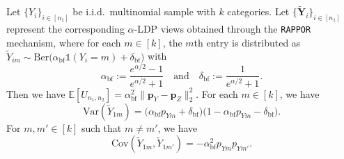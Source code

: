 \documentclass[twoside,11pt]{article}
\newcommand{\rvTwo}{Y}
\newcommand{\rvThree}{Z}
\newcommand{\vectorize}[1]{\mathbf{#1}}
\newcommand{\rvY}{Y}
\newcommand{\rVecY}{\vectorize{\rvY}}
\newcommand{\mE}{\mathbb{E}} %
\newcommand{\sampleIndexOne}{i}
\newcommand{\alphabetSize}{k} %
\newcommand{\vectorIndex}{m}
\newcommand{\sampleSize}{n}
\newcommand{\probVecElement}[2]{p_{{#1}{#2}}}
\newcommand{\probVec}{\mathbf{p}} %
\newcommand{\privacyParameter}{\alpha} %
\newcommand{\privacyParameterrappor}{\privacyParameter_{\mathrm{bf}}}
\newcommand{\smallNumber}{\delta}
\newcommand{\smallNumberrappor}{\smallNumber_{\mathrm{bf}}}
\begin{document}
\begin{appendix}
	\begin{lemma}
		\label{lemma:rappor_var}
		Let $\{\rvTwo_\sampleIndexOne\}_{\sampleIndexOne \in [\sampleSize_1]}$  be i.i.d.~multinomial sample with $\alphabetSize$ categories. Let $\{\tilde{\rVecY}_i\}_{i \in [n_1]}$ represent the corresponding $\privacyParameter$-LDP views obtained through the \textnormal{\texttt{RAPPOR}} mechanism, where for each $m \in [k]$, the $m$th entry is distributed as 
		$
		\tilde{\rvTwo}_{\sampleIndexOne \vectorIndex}
		\sim
		\mathrm{Ber}
		\bigl(
		\privacyParameterrappor \mathds{1}
		(
		\rvTwo_{\sampleIndexOne} = \vectorIndex
		) + \smallNumberrappor
		\bigr)$ with
		\begin{equation*}
			\privacyParameterrappor := \frac{e^{\privacyParameter /2} -1}{e^{\privacyParameter /2} +1} \quad \text{and} \quad
			\smallNumberrappor := \frac{1}{e^{\privacyParameter /2} +1}.
		\end{equation*}
		Then we have $\mE[U_{\sampleSize_1, \sampleSize_2}]
		=
		\privacyParameterrappor^2 \|
		\probVec_\rvTwo - \probVec_\rvThree
		\|_2^2$.
		For each $\vectorIndex \in [\alphabetSize]$, we have 
		\begin{equation*}
			\mathrm{Var}(\tilde{Y}_{1\vectorIndex})
			=
			\bigl(
			\privacyParameterrappor 
			\probVecElement{\rvTwo}{\vectorIndex}
			+ \smallNumberrappor
			\bigr)
			\bigl(
			1
			-\privacyParameterrappor 
			\probVecElement{\rvTwo}{\vectorIndex}
			- \smallNumberrappor
			\bigr).
		\end{equation*}
		For $\vectorIndex,\vectorIndex' \in [\alphabetSize]$ such that $m \neq m'$, we have
		\begin{equation*}
			\mathrm{Cov}(\tilde{Y}_{1\vectorIndex}, \tilde{Y}_{1\vectorIndex'}) = -
			\privacyParameterrappor^2 \probVecElement{\rvTwo}{\vectorIndex} \probVecElement{\rvTwo}{\vectorIndex'}
			.
		\end{equation*}
		

\end{lemma}
\end{appendix}
\end{document}
